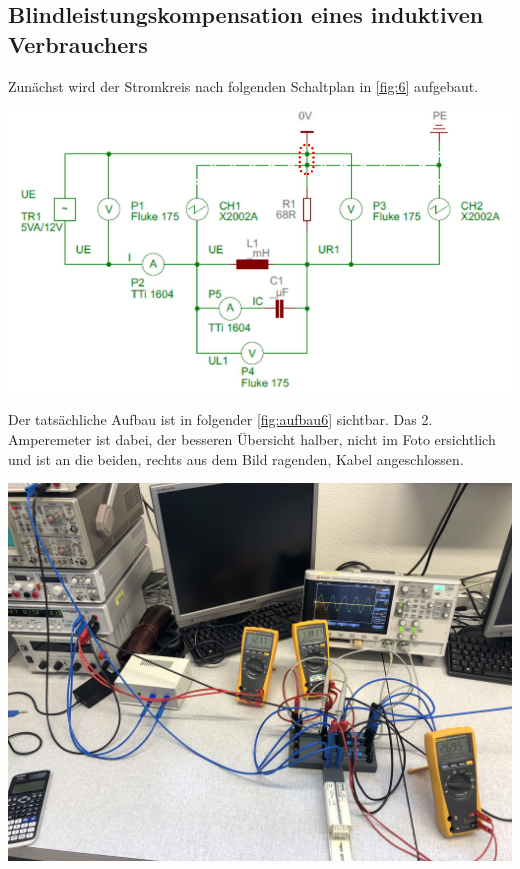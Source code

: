 \documentclass[11pt,ngerman]{scrartcl}
\begin{document}
\subsection{Blindleistungskompensation eines induktiven Verbrauchers}

Zunächst wird der Stromkreis nach folgenden Schaltplan in \autoref{fig:6} aufgebaut.

\begin{center}
	\begin{minipage}[t]{0.8\textwidth}
		\includegraphics[width=\textwidth]{skizze_6}
		\label{fig:6}
	\end{minipage}
\end{center}

\newpage

Der tatsächliche Aufbau ist in folgender \autoref{fig:aufbau6} sichtbar. Das 2. Amperemeter ist dabei, der besseren Übersicht halber, nicht im Foto ersichtlich und ist an die beiden, rechts aus dem Bild ragenden, Kabel angeschlossen.

\begin{center}
	\begin{minipage}[t]{0.7\textwidth}
		\includegraphics[width=\textwidth]{aufbau6}
		\label{fig:aufbau6}
	\end{minipage}
\end{center}
\end{document}
